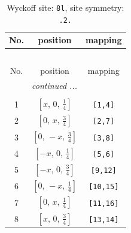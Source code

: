 \documentclass[fleqn,8pt]{jsarticle}
\begin{document}
\begin{longtable}{ccc}
\caption{Wyckoff site: {\tt 8l}, site symmetry: {\tt .2.}}
 \\
 \hline \hline
No. & position & mapping \\ \hline \endfirsthead

\multicolumn{2}{l}{\tablename\ \thetable{}} \\
 \hline \hline
No. & position & mapping \\ \hline \endhead

 \hline \hline
\multicolumn{2}{r}{\footnotesize\it continued ...} \\ \endfoot

 \hline \hline
\multicolumn{2}{r}{} \\ \endlastfoot

1 & $\left[ x,\, 0,\, \frac{1}{4} \right]$ & {\tt [1,4]} \\ \hline
2 & $\left[ 0,\, x,\, \frac{3}{4} \right]$ & {\tt [2,7]} \\ \hline
3 & $\left[ 0,\, - x,\, \frac{3}{4} \right]$ & {\tt [3,8]} \\ \hline
4 & $\left[ - x,\, 0,\, \frac{1}{4} \right]$ & {\tt [5,6]} \\ \hline
5 & $\left[ - x,\, 0,\, \frac{3}{4} \right]$ & {\tt [9,12]} \\ \hline
6 & $\left[ 0,\, - x,\, \frac{1}{4} \right]$ & {\tt [10,15]} \\ \hline
7 & $\left[ 0,\, x,\, \frac{1}{4} \right]$ & {\tt [11,16]} \\ \hline
8 & $\left[ x,\, 0,\, \frac{3}{4} \right]$ & {\tt [13,14]} \\
\end{longtable}
\renewcommand{\arraystretch}{1.2}
\end{document}
